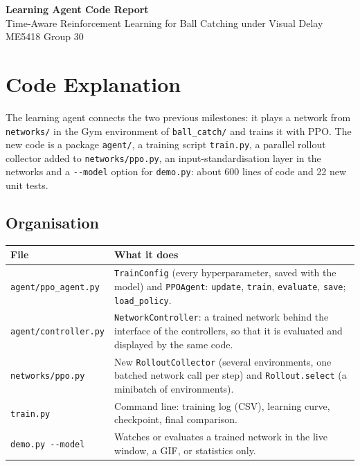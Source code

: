 \documentclass[10pt,a4paper]{article}
\newcommand{\code}[1]{\texttt{#1}}
\begin{document}
\begin{center}
  {\Large\bfseries Learning Agent Code Report}\\[3pt]
  Time-Aware Reinforcement Learning for Ball Catching under Visual Delay\\[2pt]
  ME5418 Group 30
\end{center}

\section{Code Explanation}

The learning agent connects the two previous milestones: it plays a network from \code{networks/}
in the Gym environment of \code{ball\_catch/} and trains it with PPO. The new code is a package
\code{agent/}, a training script \code{train.py}, a parallel rollout collector added to
\code{networks/ppo.py}, an input-standardisation layer in the networks and a \code{-{}-model} option
for \code{demo.py}: about 600 lines of code and 22 new unit tests.

\subsection{Organisation}

\begin{tabularx}{\textwidth}{@{}lX@{}}
  \toprule
  File & What it does \\
  \midrule
  \code{agent/ppo\_agent.py}  & \code{TrainConfig} (every hyperparameter, saved with the model) and \code{PPOAgent}:
                                 \code{update}, \code{train}, \code{evaluate}, \code{save}; \code{load\_policy}. \\
  \code{agent/controller.py} & \code{NetworkController}: a trained network behind the interface of the
                                 controllers, so that it is evaluated and displayed by the same code. \\
  \code{networks/ppo.py}     & New \code{RolloutCollector} (several environments, one batched network call per step)
                                 and \code{Rollout.select} (a minibatch of environments). \\
  \code{train.py}            & Command line: training log (CSV), learning curve, checkpoint, final comparison. \\
  \code{demo.py -{}-model}   & Watches or evaluates a trained network in the live window, a GIF, or statistics only. \\
  \bottomrule
\end{tabularx}
\end{document}
